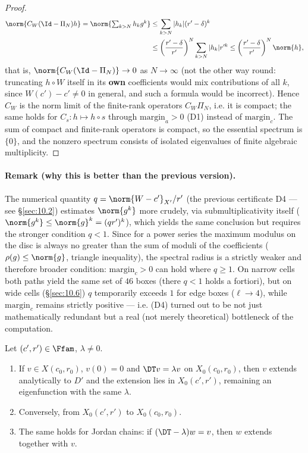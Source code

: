 \begin{proof}
\begin{align*}
\norm{C_W (\Id - \Pi_N) h} = \norm{\textstyle\sum_{k>N} h_k g^k} &\le \sum_{k>N} |h_k| (r'-\delta)^k \\
&\le \left(\frac{r'-\delta}{r'}\right)^N \sum_{k>N} |h_k| r'^k \le \left(\frac{r'-\delta}{r'}\right)^N \norm{h} ,
\end{align*}
that is, $\norm{C_W(\Id-\Pi_N)} \to 0$ as $N\to\infty$ (not the other way round: truncating
$h\circ W$ itself in its \textbf{own} coefficients would mix contributions of all $k$,
since $W(c')-c' \ne 0$ in general, and such a formula would be incorrect).
Hence $C_W$ is the norm limit of the finite-rank operators $C_W \Pi_N$, i.e.
it is compact; the same holds for $C_s : h\mapsto h\circ s$ through $\mathrm{margin}_a > 0$ (D1)
instead of $\mathrm{margin}_c$. The sum of compact and finite-rank operators is compact,
so the essential spectrum is $\{0\}$, and the nonzero spectrum consists of
isolated eigenvalues of finite algebraic multiplicity. \qedhere
\end{proof}

\paragraph{Remark (why this is better than the previous version).} The numerical quantity
$q = \norm{W-c'}_{X'}/r'$ (the previous certificate D4 --- see \S\ref{sec:10.2}) estimates
$\norm{g^k}$ more crudely, via submultiplicativity itself ($\norm{g^k} \le \norm{g}^k = (qr')^k$),
which yields the same conclusion but requires the stronger condition $q < 1$.
Since for a power series the maximum modulus on the disc is always no greater
than the sum of moduli of the coefficients ($\rho(g) \le \norm{g}$, triangle inequality),
the spectral radius is a strictly weaker and therefore broader condition:
$\mathrm{margin}_c > 0$ can hold where $q \ge 1$. On narrow cells both paths yield the
same set of $46$ boxes (there $q<1$ holds a fortiori), but on wide cells (\S\ref{sec:10.6})
$q$ temporarily exceeds $1$ for edge boxes ($\ell\to 4$), while $\mathrm{margin}_c$ remains
strictly positive --- i.e. (D4) turned out to be not just mathematically
redundant but a real (not merely theoretical) bottleneck of the computation.

\begin{lemmathree}
Let $(c',r') \in \Ffam$, $\lambda \ne 0$.
\begin{enumerate}[label=(\roman*)]
\item If $v \in X(c_0,r_0)$, $v(0) = 0$ and $\DT v = \lambda v$ on $X_0(c_0,r_0)$, then
$v$ extends analytically to $D'$ and the extension lies in $X_0(c',r')$,
remaining an eigenfunction with the same $\lambda$.
\item Conversely, from $X_0(c',r')$ to $X_0(c_0,r_0)$.
\item The same holds for Jordan chains: if $(\DT - \lambda)w = v$, then $w$
extends together with $v$.
\end{enumerate}
\end{lemmathree}

